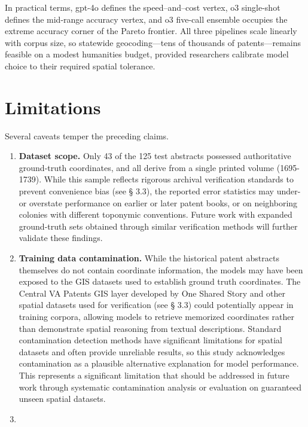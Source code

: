 In practical terms, gpt-4o defines the speed--and--cost vertex, o3
single-shot defines the mid-range accuracy vertex, and o3 five-call
ensemble occupies the extreme accuracy corner of the Pareto frontier.
All three pipelines scale linearly with corpus size, so statewide
geocoding---tens of thousands of patents---remains feasible on a modest
humanities budget, provided researchers calibrate model choice to their
required spatial tolerance.

\section{Limitations}\label{limitations}

Several caveats temper the preceding claims.

\begin{enumerate}
\def\labelenumi{\arabic{enumi}.}
\item
  \textbf{Dataset scope.} Only 43 of the 125 test abstracts possessed
  authoritative ground-truth coordinates, and all derive from a single
  printed volume (1695-1739). While this sample reflects rigorous
  archival verification standards to prevent convenience bias (see §
  3.3), the reported error statistics may under- or overstate
  performance on earlier or later patent books, or on neighboring
  colonies with different toponymic conventions. Future work with
  expanded ground-truth sets obtained through similar verification
  methods will further validate these findings.
\item
  \textbf{Training data contamination.} While the historical patent
  abstracts themselves do not contain coordinate information, the models
  may have been exposed to the GIS datasets used to establish ground
  truth coordinates. The Central VA Patents GIS layer developed by One
  Shared Story \citep{central_va_patents_gis} and other spatial datasets
  used for verification (see § 3.3) could potentially appear in training
  corpora, allowing models to retrieve memorized coordinates rather than
  demonstrate spatial reasoning from textual descriptions. Standard
  contamination detection methods have significant limitations for
  spatial datasets and often provide unreliable results, so this study
  acknowledges contamination as a plausible alternative explanation for
  model performance. This represents a significant limitation that
  should be addressed in future work through systematic contamination
  analysis or evaluation on guaranteed unseen spatial datasets.
\item

\end{enumerate}
